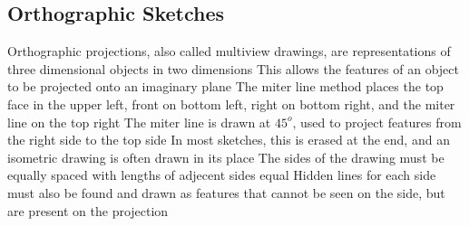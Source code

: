 \documentclass[11 pt, twoside]{article}
\newenvironment{outline*}
{
	\begin{outline}[enumerate]
	}
	{\end{outline}
}
\begin{document}
\subsection{Orthographic Sketches}
\begin{outline*}
\1 Orthographic projections, also called multiview drawings, are representations of three dimensional objects in two dimensions
\2 This allows the features of an object to be projected onto an imaginary plane
\1 The miter line method places the top face in the upper left, front on bottom left, right on bottom right, and the miter line on the top right
\2 The miter line is drawn at $45^o$, used to project features from the right side to the top side
\3 In most sketches, this is erased at the end, and an isometric drawing is often drawn in its place
\2 The sides of the drawing must be equally spaced with lengths of adjecent sides equal
\2 Hidden lines for each side must also be found and drawn as features that cannot be seen on the side, but are present on the projection
\end{outline*}
\end{document}
